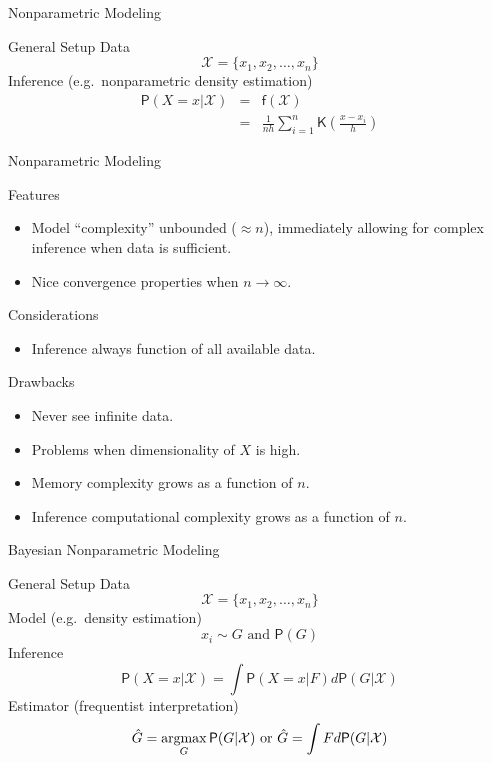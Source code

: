\begin{frame}[t]{Nonparametric Modeling}
\begin{block}{General Setup}
Data 
\[\mathcal{X} = \{x_1, x_2, \ldots, x_n\}\]
Inference (e.g.~nonparametric density estimation)
\begin{eqnarray*}
\mathsf{P}(X = x | \mathcal{X}) &=& \mathsf{f}(\mathcal{X})\\
&=& \frac{1}{nh} \sum_{i=1}^n \mathsf{K}\left(\frac{x-x_i}{h}\right) 
\end{eqnarray*}
\end{block}
\end{frame}	

\begin{frame}[t]{Nonparametric Modeling}
\begin{exampleblock}{Features}
\begin{itemize}
\item Model ``complexity'' unbounded ($\approx n$), immediately allowing for complex inference when data is sufficient.
\item Nice convergence properties when $n \rightarrow \infty$.
\end{itemize}
\end{exampleblock}
\begin{block}{Considerations}
\begin{itemize}
\item Inference always function of all available data.
\end{itemize}
\end{block}
\begin{alertblock}{Drawbacks}
\begin{itemize}
\item Never see infinite data.
\item Problems when dimensionality of $X$ is high.
\item Memory complexity grows as a function of $n$.
\item Inference computational complexity grows as a function of $n$.
\end{itemize}
\end{alertblock}
\end{frame}	

\begin{frame}[t]{Bayesian Nonparametric Modeling}
\begin{block}{General Setup}
Data 
\[\mathcal{X} = \{x_1, x_2, \ldots, x_n\}\]
Model (e.g.~density estimation)
\[x_i \sim G  \mbox{ and } \mathsf{P}(G)\]
Inference
\[\mathsf{P}(X = x | \mathcal{X}) = \int \mathsf{P}(X=x|F)d\mathsf{P}(G | \mathcal{X})\]
Estimator (frequentist interpretation)
\[\hat G = \argmax_{G} \mathsf{P}(G | \mathcal{X}) \mbox{  or  }  \hat G = \int F d\mathsf{P}(G | \mathcal{X}) \]

\end{block}
\end{frame}	

